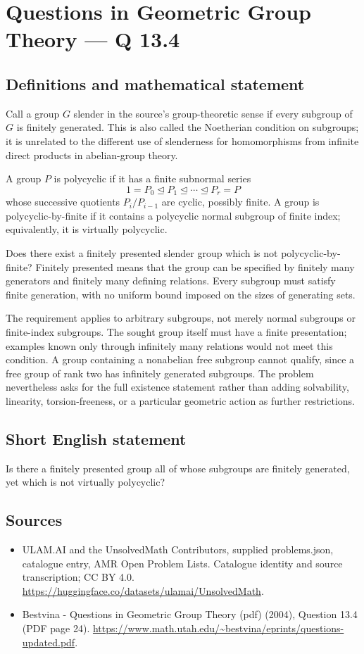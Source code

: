 \documentclass[11pt,a4paper]{article}
\begin{document}
\section*{Questions in Geometric Group Theory — Q 13.4}\label{statement}

\subsection{Definitions and mathematical statement}
Call a group $G$ slender in the source's group-theoretic sense if every subgroup of $G$ is finitely generated. This is also called the Noetherian condition on subgroups; it is unrelated to the different use of slenderness for homomorphisms from infinite direct products in abelian-group theory.

A group $P$ is polycyclic if it has a finite subnormal series
\[
 1=P_0\trianglelefteq P_1\trianglelefteq\cdots
        \trianglelefteq P_r=P
\]
whose successive quotients $P_i/P_{i-1}$ are cyclic, possibly finite. A group is polycyclic-by-finite if it contains a polycyclic normal subgroup of finite index; equivalently, it is virtually polycyclic.

Does there exist a finitely presented slender group which is not polycyclic-by-finite? Finitely presented means that the group can be specified by finitely many generators and finitely many defining relations. Every subgroup must satisfy finite generation, with no uniform bound imposed on the sizes of generating sets.

The requirement applies to arbitrary subgroups, not merely normal subgroups or finite-index subgroups. The sought group itself must have a finite presentation; examples known only through infinitely many relations would not meet this condition. A group containing a nonabelian free subgroup cannot qualify, since a free group of rank two has infinitely generated subgroups. The problem nevertheless asks for the full existence statement rather than adding solvability, linearity, torsion-freeness, or a particular geometric action as further restrictions.
\subsection{Short English statement}
Is there a finitely presented group all of whose subgroups are finitely generated, yet which is not virtually polycyclic?
\subsection{Sources}
\begin{itemize}
\item[S1] ULAM.AI and the UnsolvedMath Contributors, supplied problems.json, catalogue entry, AMR Open Problem Lists. Catalogue identity and source transcription; CC BY 4.0.
\url{https://huggingface.co/datasets/ulamai/UnsolvedMath}.
\item[S2] Bestvina - Questions in Geometric Group Theory (pdf) (2004), Question 13.4 (PDF page 24). 
\url{https://www.math.utah.edu/~bestvina/eprints/questions-updated.pdf}.
\end{itemize}
\end{document}
